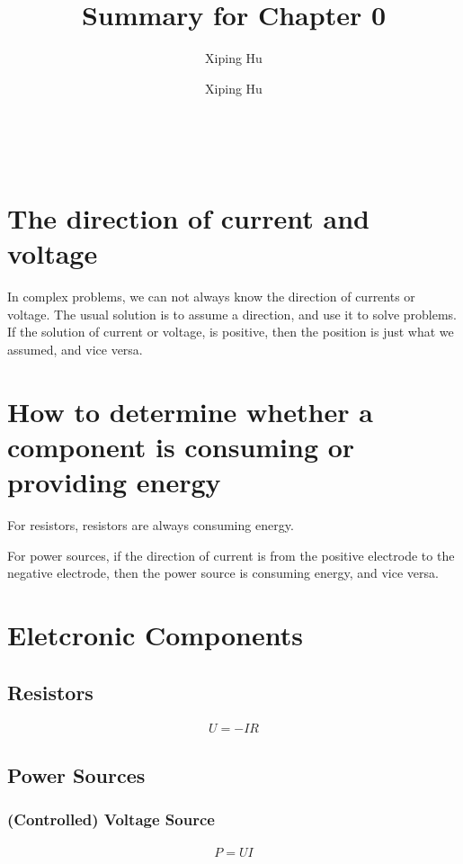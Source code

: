 \documentclass{article}
\author{Xiping Hu}
\author{Xiping Hu}
\affil{http://thehxp.tech/}
\title{Summary for Chapter 0}
\begin{document}
\maketitle

\section{The direction of current and voltage}

In complex problems, we can not always know the direction of currents or voltage. The usual solution is to assume a direction, and use it to solve problems. If the solution of current or voltage, is positive, then the position is just what we assumed, and vice versa.

\section{How to determine whether a component is consuming or providing energy}

For resistors, resistors are always consuming energy.

For power sources, if the direction of current is from the positive electrode to the negative electrode, then the power source is consuming energy, and vice versa.

\section{Eletcronic Components}

\subsection{Resistors}

\begin{equation*}
  \begin{aligned}
    U = - I R
  \end{aligned}
\end{equation*}

\subsection{Power Sources}

\subsubsection{(Controlled) Voltage Source}

\begin{equation*}
  \begin{aligned}
    P = U I
  \end{aligned}
\end{equation*}
\end{document}
